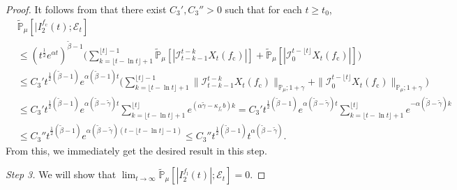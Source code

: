 \documentclass[12pt,a4paper]{amsart}
\theoremstyle{plain}
\theoremstyle{definition}
\numberwithin{equation}{section}
\begin{document}
\begin{proof}
It follows from \cite[Lemma 2.13]{RenSongSunZhao2019Stable} that there exist $C_3',C_3''>0$ such that for each $t\geq t_0$,
  \begin{align}
     &\mathbb{\widetilde{P}}_{\mu} [ |I^{f_\mathrm c}_2(t);{\mathcal{E}_t}] \\
    & \leq  (t^{\frac{1}{2}} e^{\alpha t} )^{\tilde \beta - 1}\Big(\sum_{k=\lfloor t-\ln t \rfloor+1}^{\lfloor t \rfloor - 1}\mathbb{\widetilde{P}}_{\mu} [| \mathcal{I}_{t-k-1}^{t-k} X_t(f_\mathrm c) |] + \mathbb{\widetilde{P}}_{\mu}[| \mathcal{I}_{0}^{t-\lfloor t\rfloor} X_t(f_\mathrm c)|]\Big) \\
    & \leq C_3' t^{\frac{1}{2}(\tilde \beta - 1)} e^{\alpha(\tilde \beta - 1)t}\Big(\sum_{k=\lfloor t-\ln t \rfloor+1}^{\lfloor t \rfloor - 1}\|\mathcal{I}_{t-k-1}^{t-k} X_t(f_\mathrm c) \|_{\mathbb P_\mu; 1+\gamma} + \|\mathcal I_0^{t-\lfloor t \rfloor} X_t(f_\mathrm c)\|_{\mathbb P_\mu;1+\gamma}\Big) \\
    & \leq C_3' t^{\frac{1}{2}(\tilde \beta - 1)} e^{\alpha (\tilde \beta - \tilde \gamma)t}\sum_{k=\lfloor t-\ln t \rfloor+1}^{\lfloor t \rfloor}  e^{(\alpha\tilde \gamma-\kappa_{f_\mathrm c} b)k}
      = C_3' t^{\frac{1}{2}(\tilde \beta - 1)} e^{\alpha(\tilde \beta - \tilde \gamma) t}\sum_{k=\lfloor t-\ln t \rfloor+1}^{\lfloor t \rfloor}  e^{-\alpha (\tilde \beta -\tilde \gamma) k}
    \\ & \leq C_3'' t^{\frac{1}{2}(\tilde \beta - 1)} e^{\alpha (\tilde \beta - \tilde \gamma)(t - \lfloor t - \ln t\rfloor-1)}
         \leq C_3'' t^{\frac{1}{2}(\tilde \beta - 1)} t^{\alpha (\tilde \beta - \tilde \gamma)}.
  \end{align}
  From this, we immediately get the desired result in this step.

\emph{Step 3.} We will show that $\lim_{t\rightarrow \infty}\widetilde{\mathbb P}_{\mu}[|I^{f_\mathrm l}_2(t)|;\mathcal{E}_t]=0$.



\end{proof}
\end{document}
